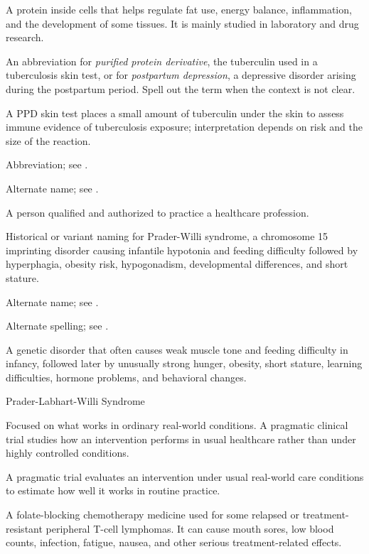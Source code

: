  A protein inside cells that helps regulate fat use, energy balance, inflammation, and the development of some tissues. It is mainly studied in laboratory and drug research.

 An abbreviation for \textit{purified protein derivative}, the tuberculin used in a tuberculosis skin test, or for \textit{postpartum depression}, a depressive disorder arising during the postpartum period. Spell out the term when the context is not clear.

 A PPD skin test places a small amount of tuberculin under the skin to assess immune evidence of tuberculosis exposure; interpretation depends on risk and the size of the reaction.

 Abbreviation; see .

 Alternate name; see .

 A person qualified and authorized to practice a healthcare profession.

 Historical or variant naming for Prader-Willi syndrome, a chromosome 15 imprinting disorder causing infantile hypotonia and feeding difficulty followed by hyperphagia, obesity risk, hypogonadism, developmental differences, and short stature.

 Alternate name; see .

 Alternate spelling; see .

 A genetic disorder that often causes weak muscle tone and feeding difficulty in infancy, followed later by unusually strong hunger, obesity, short stature, learning difficulties, hormone problems, and behavioral changes.

\synonyms
Prader-Labhart-Willi Syndrome

 Focused on what works in ordinary real-world conditions. A pragmatic clinical trial studies how an intervention performs in usual healthcare rather than under highly controlled conditions.

 A pragmatic trial evaluates an intervention under usual real-world care conditions to estimate how well it works in routine practice.

 A folate-blocking chemotherapy medicine used for some relapsed or treatment-resistant peripheral T-cell lymphomas. It can cause mouth sores, low blood counts, infection, fatigue, nausea, and other serious treatment-related effects.


